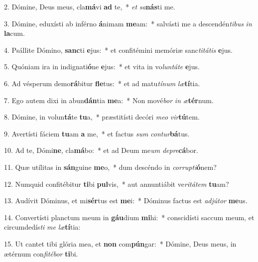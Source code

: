 2. Dómine, Deus meus, cla\textbf{má}vi \textbf{ad} te,~*  \textit{et} \textit{sa}\textbf{nás}ti me.\

3. Dómine, eduxísti ab inférno \textbf{á}nimam \textbf{me}am:~*  salvásti me a descendén\textit{ti}\textit{bus} \textit{in} \textbf{la}cum.\

4. Psállite Dómino, \textbf{sanc}ti \textbf{e}jus:~*  et confitémini memóriæ sanc\textit{ti}\textit{tá}\textit{tis} \textbf{e}jus.\

5. Quóniam ira in indignati\textbf{ó}ne \textbf{e}jus:~*  et vita in vo\textit{lun}\textit{tá}\textit{te} \textbf{e}jus.\

6. Ad vésperum demo\textbf{rá}bitur \textbf{fle}tus:~*  et ad matu\textit{tí}\textit{num} \textit{læ}\textbf{tí}tia.\

7. Ego autem dixi in abun\textbf{dán}tia \textbf{me}a:~*  Non mové\textit{bor} \textit{in} \textit{æ}\textbf{tér}num.\

8. Dómine, in volun\textbf{tá}te \textbf{tu}a,~*  præstitísti decóri \textit{me}\textit{o} \textit{vir}\textbf{tú}tem.\

9. Avertísti fáciem \textbf{tu}am \textbf{a} me,~*  et factus \textit{sum} \textit{con}\textit{tur}\textbf{bá}tus.\

10. Ad te, Dómi\textbf{ne}, cla\textbf{má}bo:~*  et ad Deum me\textit{um} \textit{de}\textit{pre}\textbf{cá}bor.\

11. Quæ utílitas in \textbf{sán}guine \textbf{me}o,~*  dum descéndo in \textit{cor}\textit{rup}\textit{ti}\textbf{ó}nem?\

12. Numquid confitébitur \textbf{ti}bi \textbf{pul}vis,~*  aut annuntiábit ve\textit{ri}\textit{tá}\textit{tem} \textbf{tu}am?\

13. Audívit Dóminus, et mi\textbf{sér}tus est \textbf{me}i:~*  Dóminus factus est \textit{ad}\textit{jú}\textit{tor} \textbf{me}us.\

14. Convertísti planctum meum in \textbf{gáu}dium \textbf{mi}hi:~*  conscidísti saccum meum, et circumdedís\textit{ti} \textit{me} \textit{læ}\textbf{tí}tia:\

15. Ut cantet tibi glória mea, et \textbf{non} com\textbf{pún}gar:~*  Dómine, Deus meus, in ætérnum con\textit{fi}\textit{té}\textit{bor} \textbf{ti}bi.\

